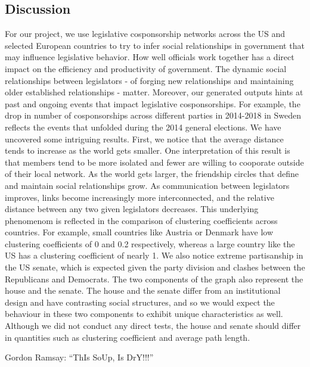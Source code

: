 \documentclass[12pt]{article}
\begin{document}
\begin{multicols*}{2}

\section{Discussion}
For our project, we use legislative cosponsorship networks across the US and selected European countries to try to infer social relationships in government that may influence legislative behavior. How well officials work together has a direct impact on the efficiency and productivity of government. The dynamic social relationships between legislators - of forging new relationships and maintaining older established relationships - matter. Moreover, our generated outputs hints at past and ongoing events that impact legislative cosponsorships. For example, the drop in number of cosponsorships across different parties in 2014-2018 in Sweden reflects the events that unfolded during the 2014 general elections. 
We have uncovered some intriguing results. First, we notice that the average distance tends to increase as the world gets smaller. One interpretation of this result is that members tend to be more isolated and fewer are willing to cooporate outside of their local network. As the world gets larger, the friendship circles that define and maintain social relationships grow. As communication between legislators improves, links become increasingly more interconnected, and the relative distance between any two given legislators decreases. This underlying phenomenom is reflected in the comparison of clustering coefficients across countries. For example, small countries like Austria or Denmark have low clustering coefficients of 0 and 0.2 respectively, whereas a large country like the US has a clustering coefficient of nearly 1. 
We also notice extreme partisanship in the US senate, which is expected given the party division and clashes between the Republicans and Democrats. The two components of the graph also represent the house and the senate. The house and the senate differ from an institutional design and have contrasting social structures, and so we would expect the behaviour in these two components to exhibit unique characteristics as well. Although we did not conduct any direct tests, the house and senate should differ in quantities such as clustering coefficient and average path length. 


Gordon Ramsay: ``ThIs SoUp, Is DrY!!!''

\begin{thebibliography}{9}


\end{thebibliography}
\end{multicols*}
\end{document}
